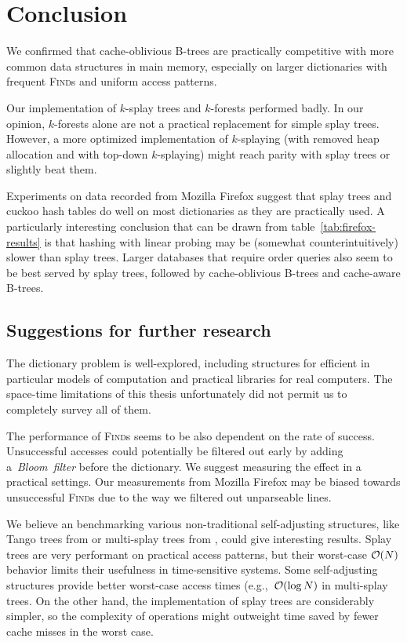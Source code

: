 \chapter*{Conclusion}

We confirmed that cache-oblivious B-trees are practically competitive with
more common data structures in main memory, especially on larger dictionaries
with frequent \textsc{Find}s and uniform access patterns.

Our implementation of $k$-splay trees and $k$-forests performed badly.
In our opinion, $k$-forests alone are not a practical replacement for simple
splay trees. However, a more optimized implementation of $k$-splaying
(with removed heap allocation and with top-down $k$-splaying) might reach
parity with splay trees or slightly beat them.

Experiments on data recorded from Mozilla Firefox suggest that splay trees
and cuckoo hash tables do well on most dictionaries as they are practically
used. A particularly interesting conclusion that can be drawn from
table~\ref{tab:firefox-results} is that hashing with linear probing may
be (somewhat counterintuitively) slower than splay trees.
Larger databases that require order queries also seem to be best served
by splay trees, followed by cache-oblivious \mbox{B-trees} and cache-aware
\mbox{B-trees}.

\section*{Suggestions for further research}
The dictionary problem is well-explored, including structures for efficient
in particular models of computation and practical libraries for real computers.
The space-time limitations of this thesis unfortunately did not permit us to
completely survey all of them.

The performance of \textsc{Find}s seems to be also dependent on
the rate of success. Unsuccessful accesses could potentially be filtered out
early by adding a~\emph{Bloom~filter} before the dictionary. We suggest
measuring the effect in a practical settings. Our measurements from Mozilla
Firefox may be biased towards unsuccessful \textsc{Find}s due to the way we
filtered out unparseable lines.

We believe an benchmarking various non-traditional self-adjusting structures,
like Tango trees from \cite{tango} or multi-splay trees from
\cite{multisplay-trees}, could give interesting results. Splay trees are very
performant on practical access patterns, but their worst-case $\mathcal{O}(N)$ behavior
limits their usefulness in time-sensitive systems. Some self-adjusting
structures provide better worst-case access times (e.g.,\ $\mathcal{O}(\log N)$ in
multi-splay trees. On the other hand, the implementation of splay trees
are considerably simpler, so the complexity of operations might outweight
time saved by fewer cache misses in the worst case.

